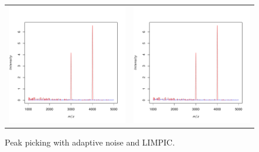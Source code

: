 \documentclass[a4paper]{article}
\begin{document}
\begin{figure}
\begin{center}
\begin{tabular}{cc}
\includegraphics{Cardinal-demo-051}
&
\includegraphics{Cardinal-demo-052}
\end{tabular}
\caption{\small Peak picking with adaptive noise and LIMPIC.}
\end{center}
\end{figure}
\end{document}
